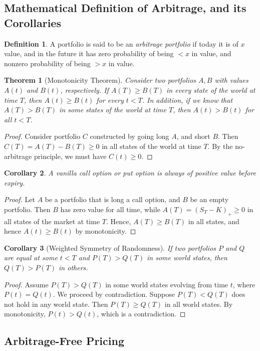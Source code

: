 \documentclass[12pt]{article}
\theoremstyle{plain}
\newtheorem{theorem}{Theorem}
\newtheorem{corollary}[theorem]{Corollary}
\theoremstyle{definition}
\newtheorem*{definition}{Definition}
\theoremstyle{remark}
\numberwithin{equation}{section}  %
\begin{document}
\subsection{Mathematical Definition of Arbitrage, and its Corollaries}
\begin{definition}
	A portfolio is said to be an \emph{arbitrage portfolio} if today it is
	of $x$ value, and in the future it has zero probability of being $<x$ in 
	value,
	and nonzero probability of being $>x$ in value. 
\end{definition}
\begin{theorem}[Monotonicity Theorem]
	Consider two portfolios $A, B$ with values $A(t)$ and $B(t)$, respectively. 
	If $A(T) \ge B(T)$ in every state of the world at time $T$, then
	$A(t) \ge B(t)$ for every $t < T$. In addition, if we know that
	$A(T) > B(T)$ in some states of the world at time $T$, then
	$A(t) > B(t)$ for all $t < T$. 
\end{theorem}
\begin{proof}
	Consider portfolio $C$ constructed by going long $A$, and short $B$. Then
	$C(T) = A(T) - B(T) \ge 0$ in all states of the world at time $T$. 
	By the no-arbitrage principle, we must have $C(t) \ge 0$. \qedhere
\end{proof}
\begin{corollary}
	A vanilla call option or put option is always of positive value before 
	expiry.
\end{corollary}
\begin{proof}
	Let $A$ be a portfolio that is long a call option, and $B$ be an empty
	portfolio.  Then $B$ has zero value for all time, while $A(T) = {(S_{T}
	- K)}_{+} \ge 0$ in all states of the market at time $T$. Hence, $A(T) \ge
	B(T)$ in all states, and hence $A(t) \ge B(t)$ by monotonicity.
\end{proof}
\begin{corollary}[Weighted Symmetry of Randomness]
	If two portfolios $P$ and $Q$ are equal at some $t < T$ and $P(T) > Q(T)$
	in some world states, then $Q(T) > P(T)$ in others. 
\end{corollary}
\begin{proof}
	Assume $P(T) > Q(T)$ in some world states evolving from time $t$, where
	$P(t) = Q(t)$. We proceed by contradiction. Suppose $P(T) < Q(T)$ does not 
	hold
	in any world state. Then $P(T) \ge Q(T)$ in all world states. By 
	monotonicity,
	$P(t) > Q(t)$, which is a contradiction.
\end{proof}
\subsection{Arbitrage-Free Pricing}
\end{document}
